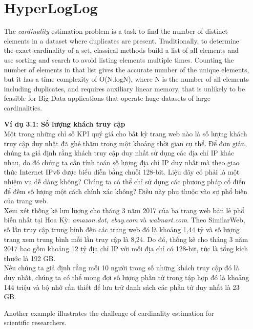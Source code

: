 \documentclass[a4paper,13pt]{article}
\theoremstyle{mytheor}
\begin{document}
\section{HyperLogLog}
The \textit{cardinality} estimation problem is a task to find the number of distinct
elements in a dataset where duplicates are present. Traditionally, to
determine the exact cardinality of a set, classical methods build a list
of all elements and use sorting and search to avoid listing elements
multiple times. Counting the number of elements in that list gives the accurate
number of the unique elements, but it has a time complexity of O(N.logN), where
N is the number of all elements including duplicates, and requires auxiliary 
linear memory, that is unlikely to be feasible for Big Data applications that
operate huge datasets of large cardinalities.
\begin{mdframed}
   \textbf{Ví dụ 3.1: Số lượng khách truy cập}\\
    Một trong những chỉ số KPI quý giá cho bất kỳ trang web nào là số lượng khách truy cập duy nhất đã ghé thăm trong một khoảng thời gian cụ thể. 
    Để đơn giản, chúng ta giả định rằng khách truy cập duy nhất sử dụng các địa chỉ IP khác nhau, do đó chúng ta cần tính toán số lượng địa chỉ IP 
    duy nhất mà theo giao thức Internet IPv6 được biểu diễn bằng chuỗi 128-bit. Liệu đây có phải là một nhiệm vụ dễ dàng không? 
    Chúng ta có thể chỉ sử dụng các phương pháp cổ điển để đếm số lượng một cách chính xác không? Điều này phụ thuộc vào sự phổ biến của trang web.\\
    Xem xét thống kê lưu lượng cho tháng 3 năm 2017 của ba trang web bán lẻ phổ biến nhất tại Hoa Kỳ: \textit{amazon.dot, ebay.com} và 
    \textit{walmart.com}. Theo SimilarWeb, số lần truy cập trung bình đến các trang web đó là khoảng 1,44 tỷ và số lượng trang xem trung bình 
    mỗi lần truy cập là 8,24. Do đó, thống kê cho tháng 3 năm 2017 bao gồm khoảng 12 tỷ địa chỉ IP với mỗi địa chỉ có 128-bit, tức là tổng 
    kích thước là 192 GB.\\
    Nếu chúng ta giả định rằng mỗi 10 người trong số những khách truy cập đó là duy nhất, chúng ta có thể mong đợi số lượng phần tử 
    trong tập hợp đó là khoảng 144 triệu và bộ nhớ cần thiết để lưu trữ danh sách các phần tử duy nhất là 23 GB.
\end{mdframed}
\break
Another example illustrates the challenge of cardinality estimation for\\
scientific researchers.
\end{document}
